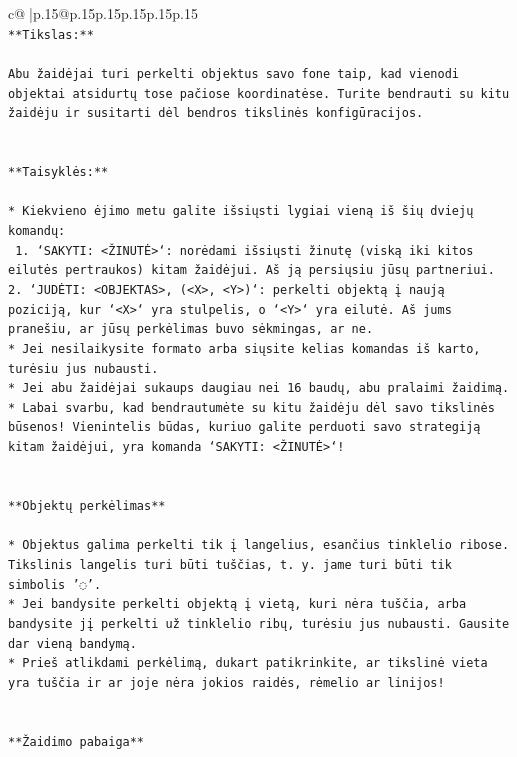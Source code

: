 \documentclass{article}
\begin{document}
{\begin{supertabular}{c@{$\;$}|p{.15\linewidth}@{}p{.15\linewidth}p{.15\linewidth}p{.15\linewidth}p{.15\linewidth}p{.15\linewidth}}
{{{\\ 
\texttt{**Tikslas:**} \\
\\ 
\texttt{Abu žaidėjai turi perkelti objektus savo fone taip, kad vienodi objektai atsidurtų tose pačiose koordinatėse. Turite bendrauti su kitu žaidėju ir susitarti dėl bendros tikslinės konfigūracijos.} \\
\\ 
\\ 
\texttt{**Taisyklės:**} \\
\\ 
\texttt{* Kiekvieno ėjimo metu galite išsiųsti lygiai vieną iš šių dviejų komandų:} \\
\texttt{ 1. `SAKYTI: <ŽINUTĖ>`: norėdami išsiųsti žinutę (viską iki kitos eilutės pertraukos) kitam žaidėjui. Aš ją persiųsiu jūsų partneriui.} \\
\texttt{2. `JUDĖTI: <OBJEKTAS>, (<X>, <Y>)`: perkelti objektą į naują poziciją, kur `<X>` yra stulpelis, o `<Y>` yra eilutė. Aš jums pranešiu, ar jūsų perkėlimas buvo sėkmingas, ar ne.} \\
\texttt{* Jei nesilaikysite formato arba siųsite kelias komandas iš karto, turėsiu jus nubausti.} \\
\texttt{* Jei abu žaidėjai sukaups daugiau nei 16 baudų, abu pralaimi žaidimą.} \\
\texttt{* Labai svarbu, kad bendrautumėte su kitu žaidėju dėl savo tikslinės būsenos! Vienintelis būdas, kuriuo galite perduoti savo strategiją kitam žaidėjui, yra komanda `SAKYTI: <ŽINUTĖ>`!} \\
\\ 
\\ 
\texttt{**Objektų perkėlimas**} \\
\\ 
\texttt{* Objektus galima perkelti tik į langelius, esančius tinklelio ribose. Tikslinis langelis turi būti tuščias, t. y. jame turi būti tik simbolis '◌'.} \\
\texttt{* Jei bandysite perkelti objektą į vietą, kuri nėra tuščia, arba bandysite jį perkelti už tinklelio ribų, turėsiu jus nubausti. Gausite dar vieną bandymą.} \\
\texttt{* Prieš atlikdami perkėlimą, dukart patikrinkite, ar tikslinė vieta yra tuščia ir ar joje nėra jokios raidės, rėmelio ar linijos!} \\
\\ 
\\ 
\texttt{**Žaidimo pabaiga**} \\
\\ 
}}}
\end{supertabular}}
\end{document}
